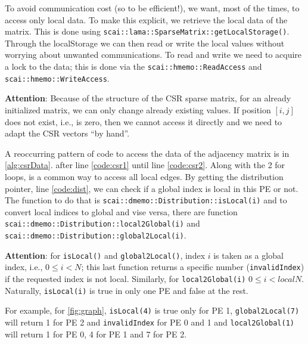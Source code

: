 \documentclass[a4paper,10pt]{article}
\newcommand{\quot}[1]{``#1''}
\newcommand{\att}{\textbf{Attention}: }
\newcommand{\MI}[1]{\texttt{#1}}
\begin{document}
To avoid communication cost (so to be efficient!), we want, most of the times, 
to access only local data. To make this explicit, we retrieve the local data of the matrix. 
This is done using \texttt{scai::lama::SparseMatrix::getLocalStorage()}. 
Through the localStorage we can then read or write the local values without 
worrying about unwanted communications. 
To read and write we need to acquire a lock to the data; this is done via the
\texttt{scai::hmemo::ReadAccess} and \texttt{scai::hmemo::WriteAccess}.

\att Because of the structure of the CSR sparse matrix, for an already initialized matrix,
we can only 
change already existing values. If position $[i,j]$ does not exist, i.e., is zero, then we cannot 
access it directly and we need to adapt the CSR vectors \quot{by hand}.

A reoccurring pattern of code to access the data of the adjacency matrix is in \cref{alg:csrData}.
after line \ref{code:csr1} until line \ref{code:csr2}. Along with the 2 for loops, 
is a common way to access all local edges. 
By getting the distribution pointer, line \ref{code:dist}, we can check if a global index is local 
in this PE or not.
The function to do that is \MI{scai::dmemo::Distribution::isLocal(i)} and to convert local
indices to global and vise versa, there are function
\MI{scai::dmemo::Distribution::local2Global(i)} and \\
\MI{scai::dmemo::Distribution::global2Local(i)}.

\att  for \MI{isLocal()} and \MI{global2Local()}, index $i$ is taken as a global index, i.e., $0\leq i <N$; this last function returns a specific number (\texttt{invalidIndex})
if the requested index is not local. Similarly, for \MI{local2Global(i)} $0\leq i < localN$.
Naturally, \MI{isLocal(i)} is true in only one PE and false at the rest.

For example, for \cref{fig:graph}, \texttt{isLocal(4)} is true only for PE 1, 
\texttt{global2Local(7)} will return 1 for PE 2 and \texttt{invalidIndex} 
for PE 0 and 1 and
\texttt{local2Global(1)} will return 1 for PE 0, 4 for PE 1 and 7 for PE 2.
\end{document}
